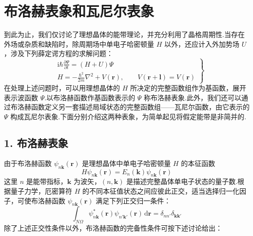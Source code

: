\section{布洛赫表象和瓦尼尔表象}

到此为止，我们仅讨论了理想晶体的能带理论，并充分利用了晶格周期性.当存在外场或杂质和缺陷时，除周期场中单电子哈密顿量 $H$ 以外，还应计入外加势场 $U$，涉及下列薛定谔方程的求解问题：
\begin{equation}
  \left.
  \begin{aligned}
    &\mathrm{i}\hbar\frac{\partial\Psi}{\partial t}=(H+U)\Psi\\
    &H=-\frac{\hbar^{2}}{2m}\nabla^{2}+V(\boldsymbol{r}),\qquad V(\boldsymbol{r}+\boldsymbol{l})=V(\boldsymbol{r})
  \end{aligned}\right\}
\end{equation}
在处理上述问题时，可以用理想晶体的 $H$ 所决定的完整函数组作为基函数，展开表示波函数 $\Psi$.以布洛赫函数作基函数表示的 $\Psi$ 称布洛赫表象.此外，我们还可以通过布洛赫函数定义另一套描述局域状态的完整函数组——瓦尼尔函数，由它表示的 $\Psi$ 构成瓦尼尔表象.下面分别介绍这两种表象，为简单起见将假定能带是非简并的.

\subsection*{1. 布洛赫表象}

由于布洛赫函数 $\psi_{n\boldsymbol{k}}(\boldsymbol{r})$ 是理想晶体中单电子哈密顿量 $H$ 的本征函数
\begin{equation}
  H\psi_{n\boldsymbol{k}}(\boldsymbol{r})=E_{n}(\boldsymbol{k})\psi_{n\boldsymbol{k}}(\boldsymbol{r})
\end{equation}
这里 $n$ 是能带指标，$\boldsymbol{k}$ 为波矢，$(n,\boldsymbol{k})$ 是描述完整晶体单电子状态的量子数.根据量子力学，厄密算符 $H$ 的不同本征值状态之间应彼此正交，适当选择归一化因子，可使布洛赫函数 $\psi_{n\boldsymbol{k}}(\boldsymbol{r})$ 满足下列正交归一条件：
\begin{equation}
  \int_{N\Omega}\psi_{n\boldsymbol{k}}^{*}(\boldsymbol{r})\psi_{n'\boldsymbol{k}'}(\boldsymbol{r})\,\mathrm{d}\boldsymbol{r}
  =\delta_{nn'}\delta_{\boldsymbol{k}\boldsymbol{k}'}
\end{equation}
除了上述正交性条件以外，布洛赫函数的完备性条件可按下述讨论给出：

